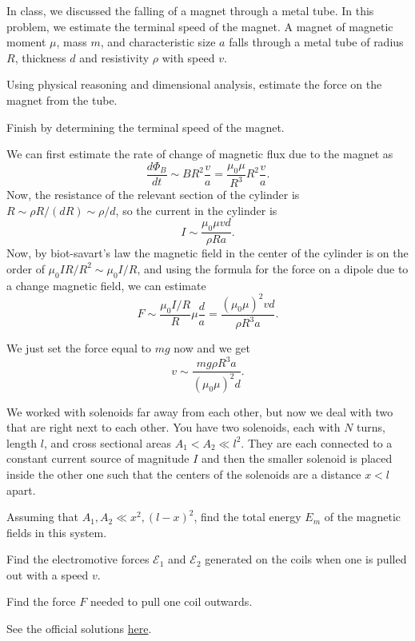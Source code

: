 \documentclass[11pt]{scrartcl}
\newcommand{\officialsol}[1]{See the official solutions \href{#1}{here}.}
\begin{document}
\begin{prob}
    In class, we discussed the falling of a magnet through a metal tube. In this problem, we estimate the terminal speed of the magnet. A magnet of magnetic moment $\mu$, mass $m$, and characteristic size $a$ falls through a metal tube of radius $R$, thickness $d$ and resistivity $\rho$ with speed $v$. \begin{anum}
        \item Using physical reasoning and dimensional analysis, estimate the force on the magnet from the tube.
        \item Finish by determining the terminal speed of the magnet.
    \end{anum}
\end{prob}
\begin{alphasol}
    \item We can first estimate the rate of change of magnetic flux due to the magnet as
    $$\frac{d\Phi_B}{dt} \sim BR^2 \frac{v}{a} = \frac{\mu_0 \mu}{R^3} R^2 \frac va.$$
    Now, the resistance of the relevant section of the cylinder is $R \sim \rho R/(dR) \sim \rho/d$, so the current in the cylinder is
    $$I \sim \frac{\mu_0 \mu v d}{\rho R a}.$$
    Now, by biot-savart's law the magnetic field in the center of the cylinder is on the order of $\mu_0 I R/R^2 \sim \mu_0 I/R$, and using the formula for the force on a dipole due to a change magnetic field, we can estimate
    $$F \sim \frac{\mu_0 I/R}{R} \mu \frac{d}{a} = \frac{(\mu_0 \mu)^2 v d}{\rho R^3a}.$$
    \item We just set the force equal to $mg$ now and we get $$v \sim \frac{mg \rho R^3 a}{(\mu_0 \mu)^2 d}.$$
\end{alphasol}

\begin{prob}[EFPhO]
    We worked with solenoids far away from each other, but now we deal with two that are right next to each other. You have two solenoids, each with $N$ turns, length $l$, and cross sectional areas $A_1 < A_2 \ll l^2$. They are each connected to a constant current source of magnitude $I$ and then the smaller solenoid is placed inside the other one such that the centers of the solenoids are a distance $x < l$ apart.
    \begin{anum}
        \item Assuming that $A_1,A_2 \ll x^2, (l-x)^2$, find the total energy $E_m$ of the magnetic fields in this system.
        \item Find the electromotive forces
        $\mathcal E_1$ and $\mathcal E_2$ generated on the coils when one is
        pulled out with a speed $v$.
        \item Find the force $F$ needed to pull
        one coil outwards.
    \end{anum}
\end{prob}
\begin{sol}
    \officialsol{https://www.ioc.ee/~kalda/ipho/es/e-s-2015-sol.pdf\#page=3}
\end{sol}
\end{document}
